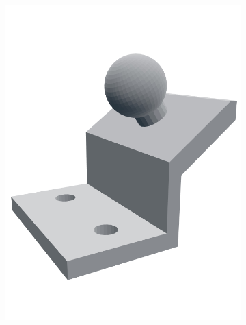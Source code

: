 \documentclass[a4paper, 12pt]{scrartcl}
\begin{document}
\begin{figure}[H] 
	\centering
	\begin{subfigure}{.25\textwidth} 
		\centering
		\includegraphics[width=\textwidth]{../3D-Druck_Modelle/Kamerahalterung_neu.png}
	\end{subfigure}%
	\begin{subfigure}{.25\textwidth} 
		\centering

\end{subfigure}
\end{figure}
\end{document}
